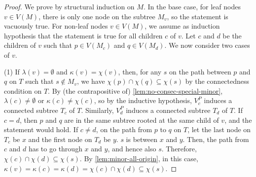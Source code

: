 \begin{proof}
    We prove by structural induction on $M$.
    In the base case, for leaf nodes $v \in V(M)$, there is only one node on the subtree $M_v$, so the statement is vacuously true.
    For non-leaf nodes $v \in V(M)$, we assume as induction hypothesis that the statement is true for all children $c$ of $v$.
    Let $c$ and $d$ be the children of $v$ such that $p \in V(M_c)$ and $q \in V(M_d)$.
    We now consider two cases of $v$.
    
    (1) If $\lambda(v) = \emptyset$ and $\kappa(v) = \chi(v)$, then, for any $s$ on the path between $p$ and $q$ on $T$ such that $s \notin M_v$, we have $\chi(p) \cap \chi(q) \subseteq \chi(s)$ by the connectedness condition on $T$.
    By (the contrapositive of) \cref{lem:no-consec-special-minor}, $\lambda(c) \neq \emptyset$ or $\kappa(c) \neq \chi(c)$, so by the inductive hypothesis, $V_c^P$ induces a connected subtree $T_c$ of $T$. Similarly, $V_d^P$ induces a connected subtree $T_d$ of $T$.
    If $c = d$, then $p$ and $q$ are in the same subtree rooted at the same child of $v$, and the statement would hold.
    If $c \neq d$,
    on the path from $p$ to $q$ on $T$, let the last node on $T_c$ be $x$ and the first node on $T_d$ be $y$. $s$ is between $x$ and $y$.
    Then, the path from $c$ and $d$ has to go through $x$ and $y$, and hence also $s$.
    Therefore, $\chi(c) \cap \chi(d) \subseteq \chi(s)$.
    By \cref{lem:minor-all-origin}, in this case, $\kappa(v) = \kappa(c) = \kappa(d) = \chi(c) \cap \chi(d) \subseteq \chi(s)$.


\end{proof}
